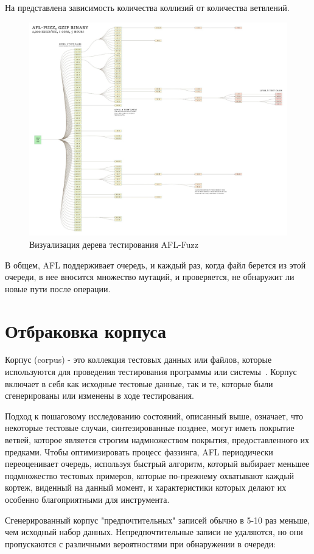 На  представлена зависимость количества коллизий от количества ветвлений.

\begin{figure}[ht] 
	\center
	\includegraphics [scale=1] {my_folder/images/test_gen}
	\caption{Визуализация дерева тестирования AFL-Fuzz~\cite{???}} 
	\label{fig:test-generation-ch3}  
\end{figure}
\par
В общем, AFL поддерживает очередь, и каждый раз, когда файл берется из этой очереди, в нее вносится множество мутаций, и проверяется, не обнаружит ли новые пути после операции.

\section{Отбраковка корпуса} \label{ch3:sec5}
Корпус (corpus) - это коллекция тестовых данных или файлов, которые используются для проведения тестирования программы или системы~\cite{???}. Корпус включает в себя как исходные тестовые данные, так и те, которые были сгенерированы или изменены в ходе тестирования.
\par
Подход к пошаговому исследованию состояний, описанный выше, означает, что некоторые тестовые случаи, синтезированные позднее, могут иметь покрытие ветвей, которое является строгим надмножеством покрытия, предоставленного их предками. Чтобы оптимизировать процесс фаззинга, AFL периодически переоценивает очередь, используя быстрый алгоритм, который выбирает меньшее подмножество тестовых примеров, которые по-прежнему охватывают каждый кортеж, виденный на данный момент, и характеристики которых делают их особенно благоприятными для инструмента.
\par 
Сгенерированный корпус "предпочтительных" записей обычно в 5-10 раз меньше, чем исходный набор данных. Непредпочтительные записи не удаляются, но они пропускаются с различными вероятностями при обнаружении в очереди:

